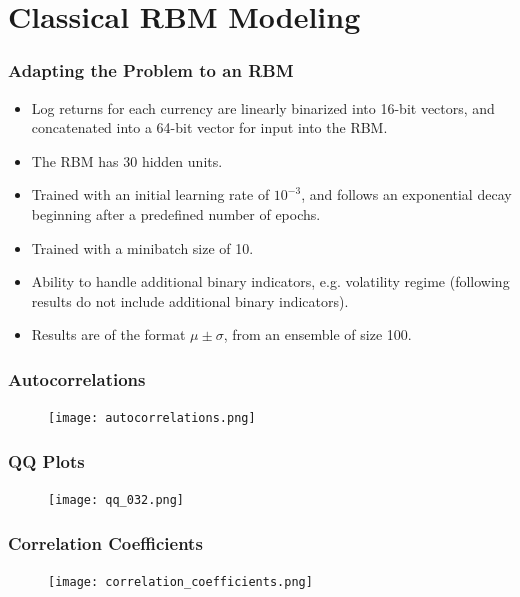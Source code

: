 \documentclass{beamer}
\begin{document}
\section{Classical RBM Modeling}

\begin{frame}
    \frametitle{Adapting the Problem to an RBM}
    \begin{itemize}
        \item Log returns for each currency are linearly binarized into 16-bit vectors, and concatenated into a 64-bit vector for input into the RBM.
        \item The RBM has 30 hidden units.
        \item Trained with an initial learning rate of \( 10^{-3} \), and follows an exponential decay beginning after a predefined number of epochs.
        \item Trained with a minibatch size of 10.
        \item Ability to handle additional binary indicators, e.g. volatility regime (following results do not include additional binary indicators).
        \item Results are of the format \( \mu \pm \sigma \), from an ensemble of size 100.
    \end{itemize}
\end{frame}


\begin{frame}
    \frametitle{Autocorrelations}
    \begin{figure}
        \texttt{[image: autocorrelations.png]}
        \label{autocorrelations}
    \end{figure}
\end{frame}

\begin{frame}
    \frametitle{QQ Plots}
    \begin{figure}
        \texttt{[image: qq\_032.png]}
        \label{qq}
    \end{figure}
\end{frame}

\begin{frame}
    \frametitle{Correlation Coefficients}
    \begin{figure}
        \texttt{[image: correlation\_coefficients.png]}
        \label{correlation_coefficients}
    \end{figure}
\end{frame}
\end{document}

